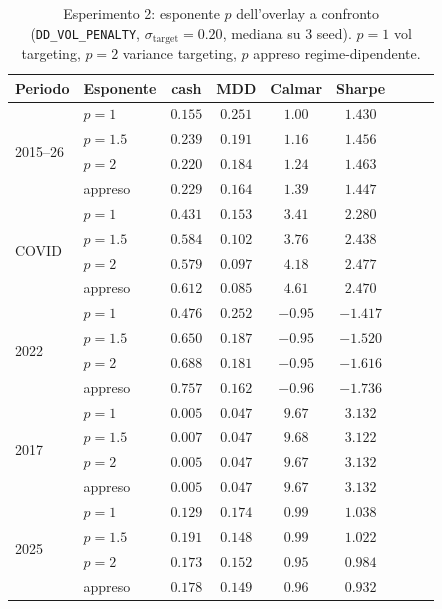 \begin{table}[H]
\centering
\small
\caption{Esperimento 2: esponente $p$ dell'overlay a confronto
(\texttt{DD\_VOL\_PENALTY}, $\sigma_{\mathrm{target}}=0.20$, mediana su 3 seed).
$p=1$ vol targeting, $p=2$ variance targeting, $p$ appreso regime-dipendente.}
\label{tab:exp2-esponente}
\begin{tabular}{llccccccc}
\toprule
Periodo & Esponente & cash & MDD & Calmar & Sharpe \\
\midrule
\multirow{4}{*}{2015--26}
 & $p=1$      & $0.155$ & $0.251$ & $1.00$ & $1.430$ \\
 & $p=1.5$    & $0.239$ & $0.191$ & $1.16$ & $1.456$ \\
 & $p=2$      & $0.220$ & $0.184$ & $1.24$ & $1.463$ \\
 & appreso    & $0.229$ & $0.164$ & $1.39$ & $1.447$ \\
\midrule
\multirow{4}{*}{COVID}
 & $p=1$      & $0.431$ & $0.153$ & $3.41$ & $2.280$ \\
 & $p=1.5$    & $0.584$ & $0.102$ & $3.76$ & $2.438$ \\
 & $p=2$      & $0.579$ & $0.097$ & $4.18$ & $2.477$ \\
 & appreso    & $0.612$ & $0.085$ & $4.61$ & $2.470$ \\
\midrule
\multirow{4}{*}{2022}
 & $p=1$      & $0.476$ & $0.252$ & $-0.95$ & $-1.417$ \\
 & $p=1.5$    & $0.650$ & $0.187$ & $-0.95$ & $-1.520$ \\
 & $p=2$      & $0.688$ & $0.181$ & $-0.95$ & $-1.616$ \\
 & appreso    & $0.757$ & $0.162$ & $-0.96$ & $-1.736$ \\
\midrule
\multirow{4}{*}{2017}
 & $p=1$      & $0.005$ & $0.047$ & $9.67$ & $3.132$ \\
 & $p=1.5$    & $0.007$ & $0.047$ & $9.68$ & $3.122$ \\
 & $p=2$      & $0.005$ & $0.047$ & $9.67$ & $3.132$ \\
 & appreso    & $0.005$ & $0.047$ & $9.67$ & $3.132$ \\
\midrule
\multirow{4}{*}{2025}
 & $p=1$      & $0.129$ & $0.174$ & $0.99$ & $1.038$ \\
 & $p=1.5$    & $0.191$ & $0.148$ & $0.99$ & $1.022$ \\
 & $p=2$      & $0.173$ & $0.152$ & $0.95$ & $0.984$ \\
 & appreso    & $0.178$ & $0.149$ & $0.96$ & $0.932$ \\
\bottomrule
\end{tabular}
\end{table}

